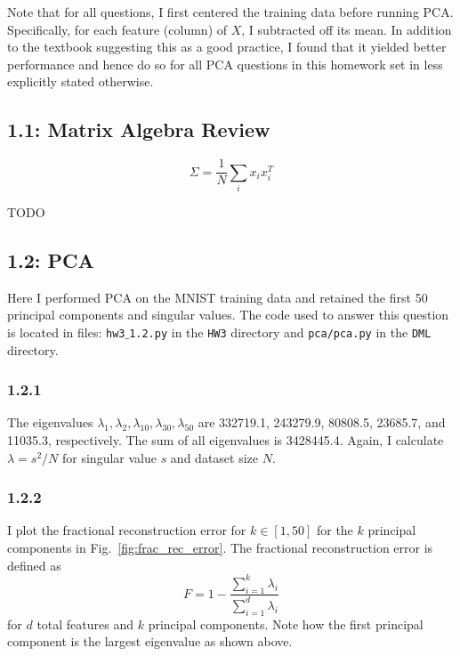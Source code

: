 \documentclass[12pt]{amsart}
\begin{document}
Note that for all questions, I first centered the training data before running PCA.  Specifically, for each feature (column) of $X$, I subtracted off its mean.  In addition to the textbook suggesting this as a good practice, I found that it yielded better performance and hence do so for all PCA questions in this homework set in less explicitly stated otherwise.

\subsection*{1.1: Matrix Algebra Review}

\begin{equation} \label{eqn:sigma}
\Sigma = \frac{1}{N}\sum_i x_i x_i^T
\end{equation}

TODO

\subsection*{1.2: PCA}

Here I performed PCA on the MNIST training data and retained the first 50 principal components and singular values.  The code used to answer this question is located in files: {\tt hw3$\_$1.2.py} in the {\tt HW3} directory and {\tt pca/pca.py} in the {\tt DML} directory.

\subsubsection*{1.2.1}

The eigenvalues $\lambda_1, \lambda_2, \lambda_{10}, \lambda_{30}, \lambda_{50}$ are 332719.1, 243279.9, 80808.5, 23685.7, and 11035.3, respectively. The sum of all eigenvalues is 3428445.4.  Again, I calculate $\lambda = s^2/N$ for singular value $s$ and dataset size $N$.

\subsubsection*{1.2.2}

I plot the fractional reconstruction error for $k \in [1,50]$ for the $k$ principal components in Fig.~\ref{fig:frac_rec_error}.  The fractional reconstruction error is defined as
\begin{equation} \label{eqn:frac_rec_error}
F = 1 - \frac{\sum_{i=1}^k \lambda_i}{\sum_{i=1}^d \lambda_i}
\end{equation}
for $d$ total features and $k$ principal components.  Note how the first principal component is the largest eigenvalue as shown above.
 
\end{document}
